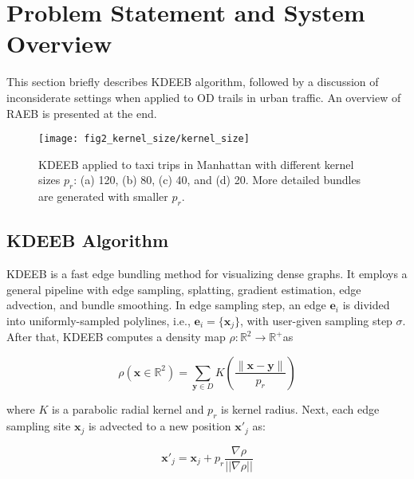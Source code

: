 \section{Problem Statement and System Overview}
\label{sec:overview}

This section briefly describes KDEEB algorithm, followed by a discussion of inconsiderate settings when applied to OD trails in urban traffic.
An overview of RAEB is presented at the end.

\begin{figure}[t] 
	\centering
	\texttt{[image: fig2\_kernel\_size/kernel\_size]}
	\vspace{-5mm}
	\caption{KDEEB applied to taxi trips in Manhattan with different kernel sizes $p_r$: (a) 120, (b) 80, (c) 40, and (d) 20.
	More detailed bundles are generated with smaller $p_r$.}
	\label{fig:kernel_size}
	\vspace{-5mm}
\end{figure}


\subsection{KDEEB Algorithm}
\label{ssec:kdeeb}
KDEEB is a fast edge bundling method for visualizing dense graphs.
It employs a general pipeline with edge sampling, splatting, gradient estimation, edge advection, and bundle smoothing.
In edge sampling step, an edge $\textbf{e}_i$ is divided into uniformly-sampled polylines, i.e., $\textbf{e}_i = \{\textbf{x}_j\}$, with user-given sampling step $\sigma$.
After that, KDEEB computes a density map $\rho : \mathbb{R}^2 \rightarrow \mathbb{R}^+ $as

\vspace{-4mm}
\begin{equation}\label{eq:kernel_density_estimation}
\rho(\textbf{x} \in \mathbb{R}^2) = \sum_{\textbf{y} \in D} K (\frac{\|\textbf{x}-\textbf{y}\|}{p_r})
\end{equation}

where $K$ is a parabolic radial kernel and $p_r$ is kernel radius.
Next, each edge sampling site $\textbf{x}_j$ is advected to a new position $\textbf{x}'_j$ as:

\vspace{-5mm}
\begin{equation}\label{eq:advecting_points}
\textbf{x}'_j = \textbf{x}_j + p_r \frac{\nabla \rho}{||\nabla \rho||}
\end{equation}

